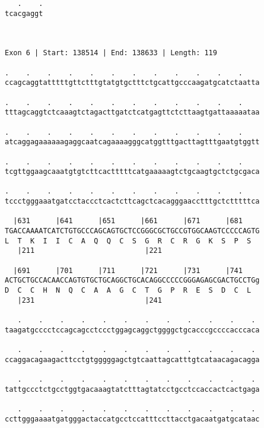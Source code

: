 \documentclass{article}
\begin{document}
\begin{Verbatim}
   .    .
tcacgaggt
         
         
 
Exon 6 | Start: 138514 | End: 138633 | Length: 119
 
.    .    .    .    .    .    .    .    .    .    .    .    
ccagcaggtatttttgttctttgtatgtgctttctgcattgcccaagatgcatctaatta
                                                            
.    .    .    .    .    .    .    .    .    .    .    .    
tttagcaggtctcaaagtctagacttgatctcatgagttctcttaagtgattaaaaataa
                                                            
.    .    .    .    .    .    .    .    .    .    .    .    
atcaggagaaaaaagaggcaatcagaaaagggcatggtttgacttagtttgaatgtggtt
                                                            
.    .    .    .    .    .    .    .    .    .    .    .    
tcgttggaagcaaatgtgtcttcactttttcatgaaaaagtctgcaagtgctctgcgaca
                                                            
.    .    .    .    .    .    .    .    .    .    .    .    
tccctgggaaatgatcctaccctcactcttcagctcacagggaacctttgctctttttca
                                                            
  |631      |641      |651      |661      |671      |681    
TGACCAAAATCATCTGTGCCCAGCAGTGCTCCGGGCGCTGCCGTGGCAAGTCCCCCAGTG
L  T  K  I  I  C  A  Q  Q  C  S  G  R  C  R  G  K  S  P  S  
   |211                          |221                       
  
  |691      |701      |711      |721      |731      |741    
ACTGCTGCCACAACCAGTGTGCTGCAGGCTGCACAGGCCCCCGGGAGAGCGACTGCCTGg
D  C  C  H  N  Q  C  A  A  G  C  T  G  P  R  E  S  D  C  L  
   |231                          |241                       
  
   .    .    .    .    .    .    .    .    .    .    .    . 
taagatgcccctccagcagcctccctggagcaggctggggctgcacccgccccacccaca
                                                            
   .    .    .    .    .    .    .    .    .    .    .    . 
ccaggacagaagacttcctgtgggggagctgtcaattagcatttgtcataacagacagga
                                                            
   .    .    .    .    .    .    .    .    .    .    .    . 
tattgccctctgcctggtgacaaagtatctttagtatcctgcctccaccactcactgaga
                                                            
   .    .    .    .    .    .    .    .    .    .    .    . 
ccttgggaaaatgatgggactaccatgcctccatttccttacctgacaatgatgcataac
                                                            

\end{Verbatim}
\end{document}
